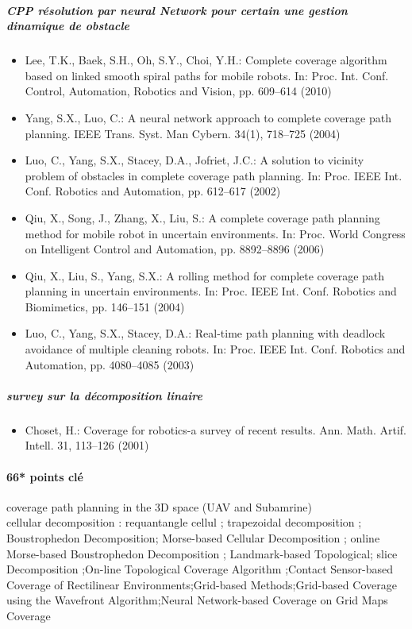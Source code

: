 \subparagraph{CPP  résolution par  neural Network pour certain une gestion dinamique de obstacle  }	
\begin{itemize}
	\item Lee, T.K., Baek, S.H., Oh, S.Y., Choi, Y.H.: Complete coverage algorithm based on linked smooth spiral paths for mobile robots. In: Proc. Int. Conf. Control, Automation, Robotics and Vision, pp. 609–614 (2010)

	
	\item Yang, S.X., Luo, C.: A neural network approach to complete coverage path planning. IEEE Trans. Syst. Man Cybern. 34(1), 718–725 (2004)



	\item Luo, C., Yang, S.X., Stacey, D.A., Jofriet, J.C.: A solution to vicinity problem of obstacles in complete coverage path planning. In: Proc. IEEE Int. Conf. Robotics
and Automation, pp. 612–617 (2002)

\item Qiu, X., Song, J., Zhang, X., Liu, S.: A complete coverage path planning method for mobile robot in uncertain environments. In: Proc. World Congress on
Intelligent Control and Automation, pp. 8892–8896 (2006)


\item Qiu, X., Liu, S., Yang, S.X.: A rolling method for 
complete coverage path planning in uncertain environments. In: Proc. IEEE Int. Conf. Robotics and
Biomimetics, pp. 146–151 (2004)

\item Luo, C., Yang, S.X., Stacey, D.A.: Real-time path planning with deadlock avoidance of multiple cleaning
robots. In: Proc. IEEE Int. Conf. Robotics and Automation, pp. 4080–4085 (2003) 

	\end{itemize}

\subparagraph{survey  sur la décomposition  linaire }
	\begin{itemize}
	\item Choset, H.: Coverage for robotics-a survey of recent results. Ann. Math. Artif. Intell. 31, 113–126 (2001)
	
	\end{itemize}
	
	\paragraph{66*  points clé}
	coverage path planning in the 3D space (UAV and Subamrine)\\ 
	cellular decomposition :  requantangle cellul  ;  trapezoidal decomposition ; Boustrophedon Decomposition; Morse-based Cellular Decomposition ; online Morse-based Boustrophedon Decomposition ; Landmark-based Topological; slice Decomposition ;On-line Topological Coverage Algorithm ;Contact Sensor-based Coverage of Rectilinear Environments;Grid-based Methods;Grid-based Coverage using the Wavefront Algorithm;Neural Network-based Coverage on Grid Maps
Coverage 
